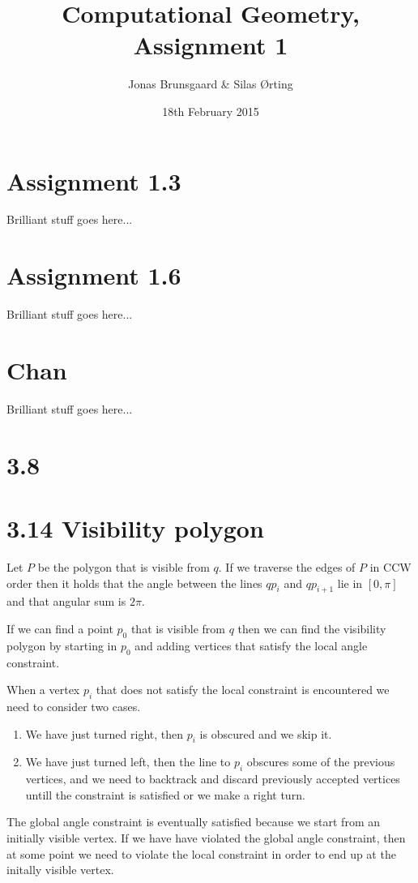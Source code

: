 \documentclass[10pt,a4paper,final,oneside,openany,article]{memoir}
\title{Computational Geometry, Assignment 1}
\author{
    Jonas Brunsgaard \& Silas Ørting
}
\date{18th February 2015}
\begin{document}
\maketitle

\chapter*{Assignment 1.3}
Brilliant stuff goes here...

\chapter*{Assignment 1.6}
Brilliant stuff goes here...

\chapter*{Chan}
Brilliant stuff goes here...

\chapter*{3.8}

\chapter*{3.14 Visibility polygon}

Let $P$ be the polygon that is visible from $q$. If we traverse the edges of $P$ in CCW order then it holds that the angle between the lines $qp_i$ and $qp_{i+1}$ lie in $[0, \pi]$ and that angular sum is $2\pi$.

If we can find a point $p_0$ that is visible from $q$ then we can find the visibility polygon by starting in $p_0$ and adding vertices that satisfy the local angle constraint.

When a vertex $p_i$ that does not satisfy the local constraint is encountered we need to consider two cases. 
\begin{enumerate}
\item We have just turned right, then $p_i$ is obscured and we skip it.
\item We have just turned left, then the line to $p_i$ obscures some of the previous vertices, and we need to backtrack and discard previously accepted vertices untill the constraint is satisfied or we make a right turn. 
\end{enumerate}

The global angle constraint is eventually satisfied because we start from an initially visible vertex. If we have have violated the global angle constraint, then at some point we need to violate the local constraint in order to end up at the initally visible vertex.
\end{document}

